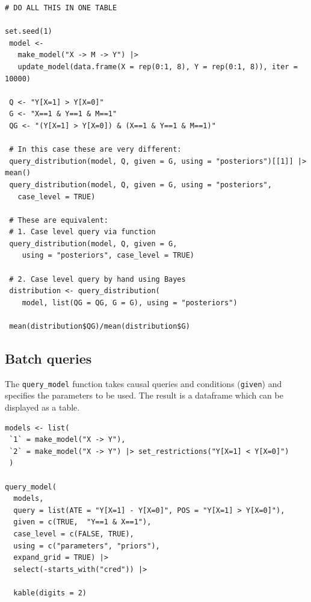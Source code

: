\documentclass[
  article]{jss}
\begin{document}
\begin{verbatim}
# DO ALL THIS IN ONE TABLE

set.seed(1)
 model <-
   make_model("X -> M -> Y") |>
   update_model(data.frame(X = rep(0:1, 8), Y = rep(0:1, 8)), iter = 10000)

 Q <- "Y[X=1] > Y[X=0]"
 G <- "X==1 & Y==1 & M==1"
 QG <- "(Y[X=1] > Y[X=0]) & (X==1 & Y==1 & M==1)"

 # In this case these are very different:
 query_distribution(model, Q, given = G, using = "posteriors")[[1]] |> mean()
 query_distribution(model, Q, given = G, using = "posteriors",
   case_level = TRUE)

 # These are equivalent:
 # 1. Case level query via function
 query_distribution(model, Q, given = G,
    using = "posteriors", case_level = TRUE)

 # 2. Case level query by hand using Bayes
 distribution <- query_distribution(
    model, list(QG = QG, G = G), using = "posteriors")

 mean(distribution$QG)/mean(distribution$G)
\end{verbatim}

\hypertarget{batch-queries}{%
\subsection{Batch queries}\label{batch-queries}}

The \texttt{query\_model} function takes causal queries and conditions
(\texttt{given}) and specifies the parameters to be used. The result is
a dataframe which can be displayed as a table.

\begin{verbatim}
models <- list(
 `1` = make_model("X -> Y"),
 `2` = make_model("X -> Y") |> set_restrictions("Y[X=1] < Y[X=0]")
 )

query_model(
  models,
  query = list(ATE = "Y[X=1] - Y[X=0]", POS = "Y[X=1] > Y[X=0]"),
  given = c(TRUE,  "Y==1 & X==1"),
  case_level = c(FALSE, TRUE),
  using = c("parameters", "priors"),
  expand_grid = TRUE) |>
  select(-starts_with("cred")) |>
  
  kable(digits = 2)
\end{verbatim}
\end{document}
